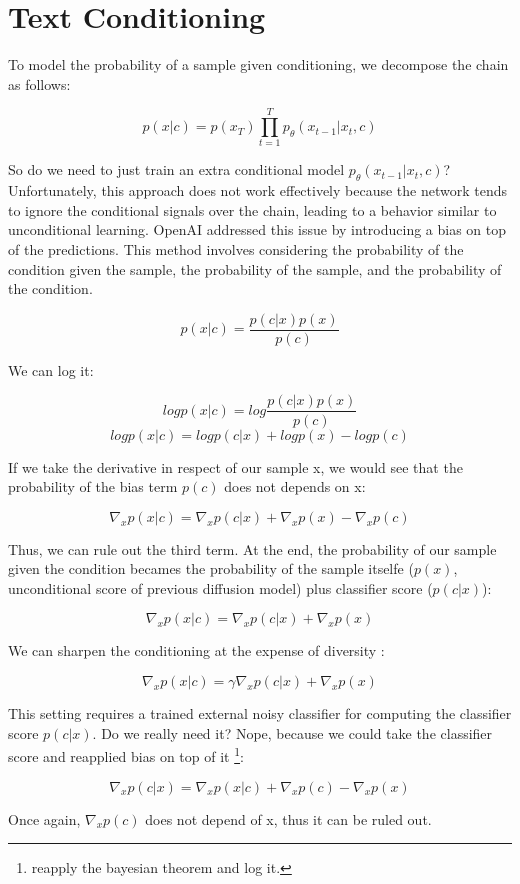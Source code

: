 \section{Text Conditioning}

To model the probability of a sample given conditioning, we decompose the chain as follows:

$$p(x|c)= p(x_T)\prod_{t=1}^{T}p_{\theta}(x_{t-1}|x_t,c)$$


So do we need to just train an extra conditional model $ p_{\theta}(x_{t-1}|x_t,c)$? Unfortunately, this approach does not work effectively because the network tends to ignore the conditional signals over the chain, leading to a behavior similar to unconditional learning. OpenAI addressed this issue by introducing a bias on top of the predictions. This method involves considering the probability of the condition given the sample, the probability of the sample, and the probability of the condition.

$$p(x|c)= \frac{p(c|x)p(x)}{p(c)}$$

We can log it:

$$logp(x|c)= log \frac{p(c|x)p(x)}{p(c)}$$
$$logp(x|c)= log p(c|x) + log p(x) -log p(c)$$

If we take the derivative in respect of our sample x, we would see that the probability of the bias term $p(c)$ does not depends on x:

$$\nabla_x p(x|c)= \nabla_x  p(c|x) + \nabla_x  p(x) - \nabla_x  p(c)$$

Thus, we can rule out the third term. At the end, the probability of our sample given the condition becames the probability of the sample itselfe ($p(x)$, unconditional score of previous diffusion model) plus classifier score ($p(c|x)$):

$$\nabla_x p(x|c)= \nabla_x  p(c|x) + \nabla_x  p(x)$$

We can sharpen the conditioning at the expense of diversity :

$$\nabla_x  p(x|c)= \gamma \nabla_x  p(c|x) + \nabla_x p(x) $$

This setting requires a trained external noisy classifier for computing the classifier score $p(c|x)$. Do we really need it? Nope, because we could take the classifier score and reapplied bias on top of it \footnote{reapply the bayesian theorem and log it.}:

$$ \nabla_x  p(c|x)  = \nabla_x  p(x|c) + \nabla_x p(c) - \nabla_x p(x)$$

Once again, $ \nabla_x p(c)$ does not depend of x, thus it can be ruled out. 


